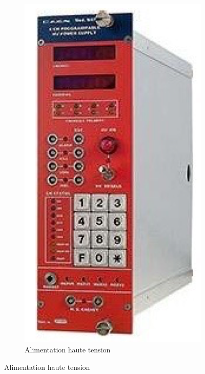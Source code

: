 \begin{figure}[p]
    \centering
    \begin{subfigure}[t]{0.2\textwidth}
        \includegraphics[height=0.25\textheight, width=\textwidth, keepaspectratio]{figures/Alim1.png}
        \caption{Alimentation haute tension}
        \label{fig:HV}
    \end{subfigure}

\end{figure}
